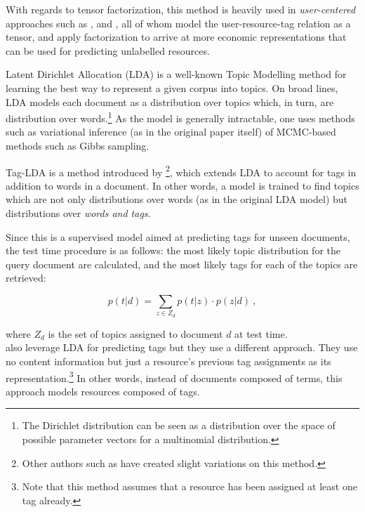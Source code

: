With regards to tensor factorization, this method is heavily used in \textit{user-centered} approaches such as \cite{rendle_schmidt-thieme_2009}, \cite{rendle_etal_2009} and \cite{symeonidis_etal_2008}, all of whom model the user-resource-tag relation as a tensor, and apply factorization to arrive at more economic representations that can be used for predicting unlabelled resources.

Latent Dirichlet Allocation (LDA) \citep{blei_etal_2003} is a well-known Topic Modelling method for learning the best way to represent a given corpus into topics. On broad lines, LDA models each document as a distribution over topics which, in turn, are distribution over words.\footnote{The Dirichlet distribution can be seen as a distribution over the space of possible parameter vectors for a multinomial distribution.} As the model is generally intractable, one uses methods such as variational inference (as in the original paper itself) of MCMC-based methods such as Gibbs sampling.

Tag-LDA is a method introduced by \cite{si_sun_2008}\footnote{Other authors such as \cite{hu_etal_2012} have created slight variations on this method.}, which extends LDA to account for tags in addition to words in a document. In other words, a model is trained to find topics which are not only distributions over words (as in the original LDA model) but distributions over \textit{words and tags}. 

Since this is a supervised model aimed at predicting tags for unseen documents, the test time procedure is as follows: the most likely topic distribution for the query document are calculated, and the most likely tags for each of the topics are retrieved:

\begin{equation}
p(t | d ) = \sum_{z \in Z_d} p(t|z) \cdot p(z|d) \ ,
\end{equation}

where $Z_d$ is the set of topics assigned to document $d$ at test time.\\

\cite{krestel_fankhauser_2010} also leverage LDA for predicting tags but they use a different approach. They use no content information but just a resource's previous tag assignments as its representation.\footnote{Note that this method assumes that a resource has been assigned at least one tag already.} In other words, instead of documents composed of terms, this approach models resources composed of tags.


